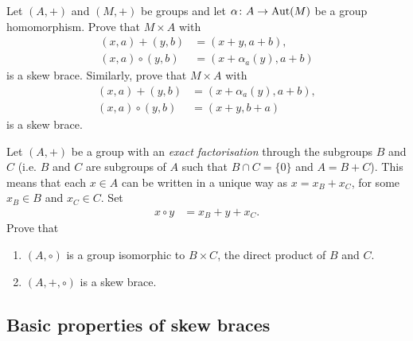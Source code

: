    \begin{exercise}\label{ex:sd}
    	Let $(A,+)$ and $(M,+)$ be groups and let $\alpha\colon A\to\operatorname{Aut}(M)$ be a
    	group homomorphism. Prove that $M\times A$ with 
    	\begin{align*}
        	(x,a)+(y,b)&=(x+y,a+b),
        	\\
        	(x,a)\circ (y,b)&=(x+\alpha_a(y),a+b)
    	\end{align*}
    	is a skew brace. Similarly, prove that $M\times A$ with
    	\begin{align*}
        	(x,a)+(y,b)&=(x+\alpha_a(y),a+b),\\
        	(x,a)\circ (y,b)&=(x+y,b+a)
    	\end{align*}
    	is a skew brace. 
    \end{exercise}

    \begin{exercise}\label{ex:ef}
        Let $(A,+)$ be a group with an \emph{exact factorisation} through the subgroups $B$ and $C$ (i.e. $B$ and $C$ are subgroups of $A$ such that $B\cap C=\{ 0\}$ and $A=B+C$). 
        This means that each $x\in A$ can be written in a unique way as $x=x_B+x_C$, for some $x_B\in B$ and $x_C\in C$.
        Set
        \begin{align*}
		    x\circ y&=x_B+y+x_C.
	    \end{align*}
        Prove that
        \begin{enumerate}
            \item $(A,\circ)$ is a group isomorphic to $B\times C$, the direct product of $B$ and $C$.
            \item $(A,+,\circ)$ is a  skew brace.
        \end{enumerate}
    \end{exercise}

    
    \subsection{Basic properties of skew braces}

